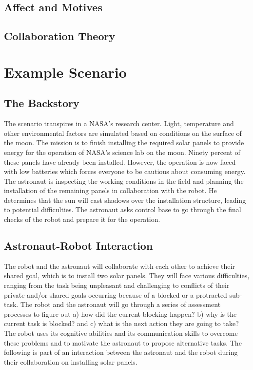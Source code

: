 \subsection{Affect and Motives}

\subsection{Collaboration Theory}
\label{sec:collaboration-theory}

\section{Example Scenario}
\label{sec:1}

\subsection{The Backstory}

The scenario transpires in a NASA's research center. Light, temperature and
other environmental factors are simulated based on conditions on the surface of
the moon. The mission is to finish installing the required solar panels to
provide energy for the operation of NASA's science lab on the moon. Ninety
percent of these panels have already been installed. However, the operation is
now faced with low batteries which forces everyone to be cautious about
consuming energy. The astronaut is inspecting the working conditions in the
field and planning the installation of the remaining panels in collaboration
with the robot. He determines that the sun will cast shadows over the
installation structure, leading to potential difficulties. The astronaut asks
control base to go through the final checks of the robot and prepare it for the
operation.

\subsection{Astronaut-Robot Interaction}

The robot and the astronaut will collaborate with each other to achieve their
shared goal, which is to install two solar panels. They will face various
difficulties, ranging from the task being unpleasant and challenging to
conflicts of their private and/or shared goals occurring because of a blocked or
a protracted sub-task. The robot and the astronaut will go through a series of
assessment processes to figure out a) how did the current blocking happen? b)
why is the current task is blocked? and c) what is the next action they are
going to take? The robot uses its cognitive abilities and its communication
skills to overcome these problems and to motivate the astronaut to propose
alternative tasks. The following is part of an interaction between the astronaut
and the robot during their collaboration on installing solar panels.

